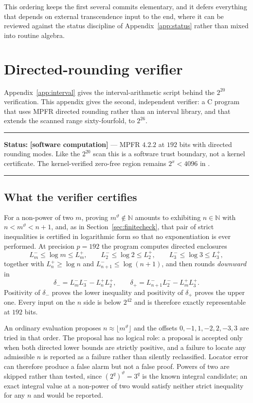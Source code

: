 \documentclass[11pt,oneside]{article}
\theoremstyle{definition}
\theoremstyle{remark}
\newcommand{\N}{\mathbb N}
\newcommand{\thetaq}{\vartheta}
\newcommand{\lean}[1]{\texttt{\detokenize{#1}}}
\newcommand{\statuscomp}{\textcolor{computeviolet}{\textbf{[software computation]}}}
\newenvironment{statusbox}[1]
{\begin{center}\begin{minipage}{0.94\textwidth}\raggedright\hbadness=10000\hrule
\vspace{0.45em}\textbf{Status:} #1\par\vspace{0.35em}}
{\vspace{0.35em}\hrule\end{minipage}\end{center}}
\begin{document}
This ordering keeps the first several commits elementary, and it defers everything that
depends on external transcendence input to the end, where it can be reviewed against the
status discipline of Appendix~\ref{app:status} rather than mixed into routine algebra.

\section{Directed-rounding verifier}
\label{app:scanner}

Appendix~\ref{app:interval} gives the interval-arithmetic script behind the $2^{20}$
verification.  This appendix gives the second, independent verifier: a C program that uses
MPFR directed rounding rather than an interval library, and that extends the scanned range
sixty-fourfold, to $2^{26}$.

\begin{statusbox}{\statuscomp{} --- MPFR $4.2.2$ at $192$ bits with directed rounding modes.
Like the $2^{20}$ scan this is a software trust boundary, not a kernel certificate.  The
kernel-verified zero-free region remains $2^{x}<4096$ in \lean{FiniteCheck4096}.}
\end{statusbox}

\subsection{What the verifier certifies}
\label{a3:verifier-contract}

For a non-power of two $m$, proving $m^{\thetaq}\notin\N$ amounts to exhibiting $n\in\N$ with
$n<m^{\thetaq}<n+1$, and, as in Section~\ref{sec:finitecheck}, that pair of strict
inequalities is certified in logarithmic form so that no exponentiation is ever performed.
At precision $p=192$ the program computes directed enclosures
\[
  L_m^{-}\le\log m\le L_m^{+},
  \qquad
  L_2^{-}\le\log2\le L_2^{+},
  \qquad
  L_3^{-}\le\log3\le L_3^{+},
\]
together with $L_n^{+}\ge\log n$ and $L_{n+1}^{-}\le\log(n+1)$, and then rounds
\emph{downward} in
\[
  \delta_{-}=L_m^{-}L_3^{-}-L_n^{+}L_2^{+},
  \qquad
  \delta_{+}=L_{n+1}^{-}L_2^{-}-L_m^{+}L_3^{+}.
\]
Positivity of $\delta_{-}$ proves the lower inequality and positivity of $\delta_{+}$ proves
the upper one.  Every input on the $n$ side is below $2^{42}$ and is therefore exactly
representable at $192$ bits.

An ordinary \lean{long double} evaluation proposes $n\approx\lfloor m^{\thetaq}\rfloor$ and
the offsets $0,-1,1,-2,2,-3,3$ are tried in that order.  The proposal has no logical role: a
proposal is accepted only when both directed lower bounds are strictly positive, and a
failure to locate any admissible $n$ is reported as a failure rather than silently
reclassified.  Locator error can therefore produce a false alarm but not a false proof.
Powers of two are skipped rather than tested, since $\left(2^{q}\right)^{\thetaq}=3^{q}$ is
the known integral candidate; an exact integral value at a non-power of two would satisfy
neither strict inequality for any $n$ and would be reported.
\end{document}
